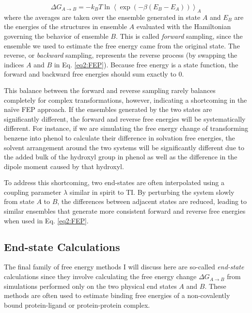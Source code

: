 \begin{equation}
   \Delta G _ {A \rightarrow B} = -k_B T \ln \left \langle \exp \left( - \beta
         (E_B - E_A) \right) \right \rangle _ A
   \label{eq2:FEP}
\end{equation}
where the averages are taken over the ensemble generated in state $A$ and $E_B$
are the energies of the structures in ensemble $A$ evaluated with the
Hamiltonian governing the behavior of ensemble $B$. This is called
\emph{forward} sampling, since the ensemble we used to estimate the free energy
came from the original state. \cite{Leach_Book_MolModel_2001} The reverse, or
\emph{backward} sampling, represents the reverse process (\ie by swapping the
indices $A$ and $B$ in Eq. \ref{eq2:FEP}). Because free energy is a state
function, the forward and backward free energies should sum exactly to 0.

This balance between the forward and reverse sampling rarely balances completely
for complex transformations, however, indicating a shortcoming in the na\"ive
FEP approach. If the ensembles generated by the two states are significantly
different, the forward and reverse free energies will be systematically
different. For instance, if we are simulating the free energy change of
transforming benzene into phenol to calculate their difference in solvation free
energies, the solvent arrangement around the two systems will be significantly
different due to the added bulk of the hydroxyl group in phenol as well as the
difference in the dipole moment caused by that hydroxyl.

To address this shortcoming, two end-states are often interpolated using a
coupling parameter $\lambda$ similar in spirit to TI. By perturbing the system
slowly from state $A$ to $B$, the differences between adjacent states are
reduced, leading to similar ensembles that generate more consistent forward and
reverse free energies when used in Eq. \ref{eq2:FEP}.
\cite{Leach_Book_MolModel_2001}

\subsection{End-state Calculations}

The final family of free energy methods I will discuss here are so-called
\emph{end-state} calculations since they involve calculating the free energy
change $\Delta G_{A \rightarrow B}$ from simulations performed only on the two
physical end states $A$ and $B$. These methods are often used to estimate
binding free energies of a non-covalently bound protein-ligand or
protein-protein complex. \cite{Massova1999, Gohlke2003, Gohlke2004, Homeyer2012,
MMPBSApy}

